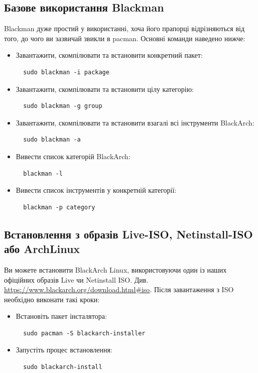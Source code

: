 \documentclass[a4paper, oneside, 11pt]{book}
\begin{document}
\subsection{Базове використання Blackman}
Blackman дуже простий у використанні, хоча його прапорці відрізняються від того, до чого ви зазвичай звикли в pacman. Основні команди наведено нижче:
\begin{itemize}
\item Завантажити, скомпілювати та встановити конкретний пакет:
\begin{lstlisting}
  sudo blackman -i package
\end{lstlisting}

\item Завантажити, скомпілювати та встановити цілу категорію:
\begin{lstlisting}
  sudo blackman -g group
\end{lstlisting}

\item Завантажити, скомпілювати та встановити взагалі всі інструменти BlackArch:
\begin{lstlisting}
  sudo blackman -a
\end{lstlisting}

\item Вивести список категорій BlackArch:
\begin{lstlisting}
  blackman -l
\end{lstlisting}

\item Вивести список інструментів у конкретній категорії:
\begin{lstlisting}
  blackman -p category
\end{lstlisting}
\end{itemize}

\subsection{Встановлення з образів Live-ISO, Netinstall-ISO або ArchLinux}
Ви можете встановити BlackArch Linux, використовуючи один із наших офіційних образів Live чи Netinstall ISO. Див. \url{https://www.blackarch.org/download.html#iso}. Після завантаження з ISO необхідно виконати такі кроки:
\begin{itemize}
\item Встановіть пакет інсталятора:
\begin{lstlisting}
  sudo pacman -S blackarch-installer
\end{lstlisting}

\item Запустіть процес встановлення:
\begin{lstlisting}
  sudo blackarch-install
\end{lstlisting}
\end{itemize}
\end{document}
